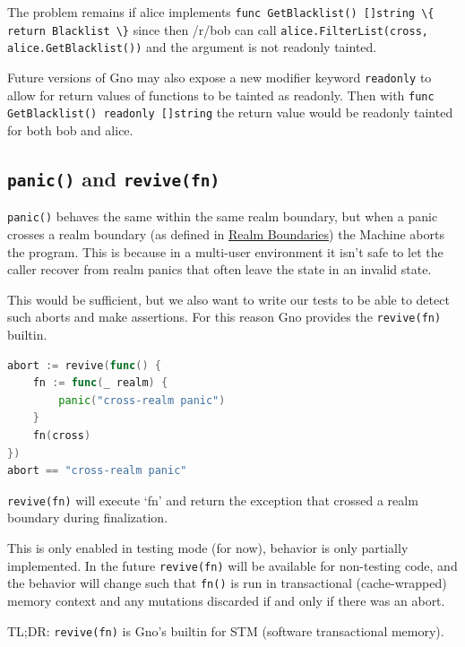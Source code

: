 \documentclass[12pt,a4paper]{article}
\newcommand{\passthrough}[1]{#1}
\begin{document}
The problem remains if alice implements
\passthrough{\lstinline!func GetBlacklist() []string \{ return Blacklist \}!}
since then /r/bob can call
\passthrough{\lstinline!alice.FilterList(cross, alice.GetBlacklist())!}
and the argument is not readonly tainted.

Future versions of Gno may also expose a new modifier keyword
\passthrough{\lstinline!readonly!} to allow for return values of
functions to be tainted as readonly. Then with
\passthrough{\lstinline!func GetBlacklist() readonly []string!} the
return value would be readonly tainted for both bob and alice.

\subsection{\texorpdfstring{\texttt{panic()} and
\texttt{revive(fn)}}{panic() and revive(fn)}}\label{panic-and-revivefn}

\passthrough{\lstinline!panic()!} behaves the same within the same realm
boundary, but when a panic crosses a realm boundary (as defined in
\hyperref[realm-boundaries]{Realm Boundaries}) the Machine aborts the
program. This is because in a multi-user environment it isn't safe to
let the caller recover from realm panics that often leave the state in
an invalid state.

This would be sufficient, but we also want to write our tests to be able
to detect such aborts and make assertions. For this reason Gno provides
the \passthrough{\lstinline!revive(fn)!} builtin.

\begin{lstlisting}[language=Go]
abort := revive(func() {
    fn := func(_ realm) {
        panic("cross-realm panic")
    }
    fn(cross)
})
abort == "cross-realm panic"
\end{lstlisting}

\passthrough{\lstinline!revive(fn)!} will execute `fn' and return the
exception that crossed a realm boundary during finalization.

This is only enabled in testing mode (for now), behavior is only
partially implemented. In the future
\passthrough{\lstinline!revive(fn)!} will be available for non-testing
code, and the behavior will change such that
\passthrough{\lstinline!fn()!} is run in transactional (cache-wrapped)
memory context and any mutations discarded if and only if there was an
abort.

TL;DR: \passthrough{\lstinline!revive(fn)!} is Gno's builtin for STM
(software transactional memory).
\end{document}
